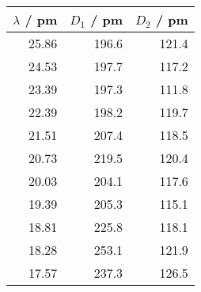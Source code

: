 \begin{tabular}{r|rr}
$\lambda$ / pm & $D_1$ / pm & $D_2$ / pm  \\
\hline
25.86 & 196.6 & 121.4\\
24.53 & 197.7 & 117.2\\
23.39 & 197.3 & 111.8\\
22.39 & 198.2 & 119.7\\
21.51 & 207.4 & 118.5\\
20.73 & 219.5 & 120.4\\
20.03 & 204.1 & 117.6\\
19.39 & 205.3 & 115.1\\
18.81 & 225.8 & 118.1\\
18.28 & 253.1 & 121.9\\
17.57 & 237.3 & 126.5\\
\end{tabular}
